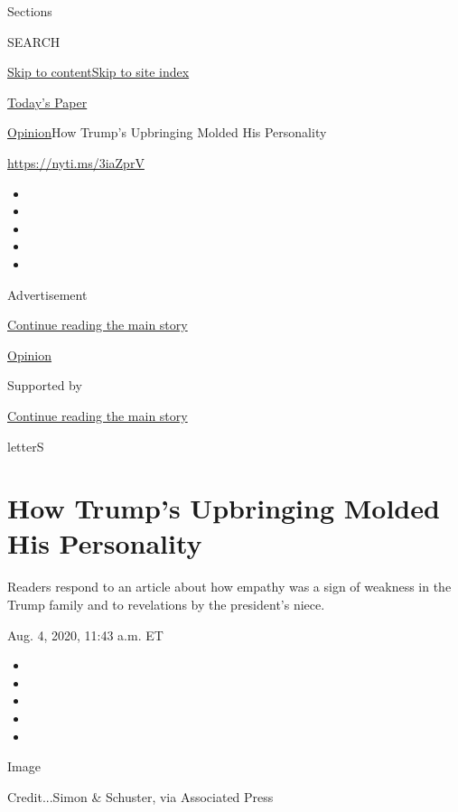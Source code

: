 Sections

SEARCH

\protect\hyperlink{site-content}{Skip to
content}\protect\hyperlink{site-index}{Skip to site index}

\href{https://myaccount.nytimes.com/auth/login?response_type=cookie\&client_id=vi}{}

\href{https://www.nytimes.com/section/todayspaper}{Today's Paper}

\href{/section/opinion}{Opinion}\textbar{}How Trump's Upbringing Molded
His Personality

\url{https://nyti.ms/3iaZprV}

\begin{itemize}
\item
\item
\item
\item
\item
\end{itemize}

Advertisement

\protect\hyperlink{after-top}{Continue reading the main story}

\href{/section/opinion}{Opinion}

Supported by

\protect\hyperlink{after-sponsor}{Continue reading the main story}

letterS

\hypertarget{how-trumps-upbringing-molded-his-personality}{%
\section{How Trump's Upbringing Molded His
Personality}\label{how-trumps-upbringing-molded-his-personality}}

Readers respond to an article about how empathy was a sign of weakness
in the Trump family and to revelations by the president's niece.

Aug. 4, 2020, 11:43 a.m. ET

\begin{itemize}
\item
\item
\item
\item
\item
\end{itemize}

Image

Credit...Simon \& Schuster, via Associated Press

